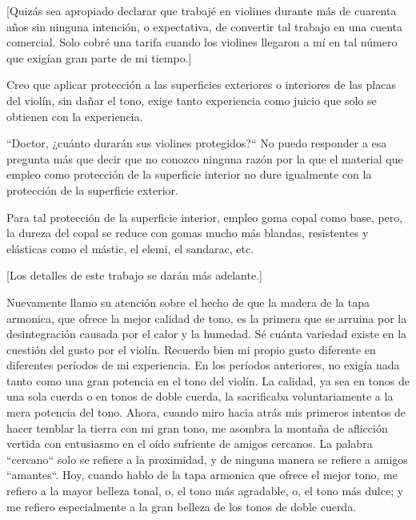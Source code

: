 \documentclass[12pt]{book}
\begin{document}
[Quizás sea apropiado declarar que trabajé en violines durante más de cuarenta años sin ninguna intención, o expectativa, de convertir tal trabajo en una cuenta comercial. Solo cobré una tarifa cuando los violines llegaron a mí en tal número que exigían gran parte de mi tiempo.]

Creo que aplicar protección a las superficies exteriores o interiores de las placas del violín, sin dañar el tono, exige tanto experiencia como juicio que solo se obtienen con la experiencia.

``Doctor, ¿cuánto durarán sus violines protegidos?`` No puedo responder a esa pregunta más que decir que no conozco ninguna razón por la que el material que empleo como protección de la superficie interior no dure igualmente con la protección de la superficie exterior.

Para tal protección de la superficie interior, empleo goma copal como base, pero, la dureza del copal se reduce con gomas mucho más blandas, resistentes y elásticas como el mástic, el elemi, el sandarac, etc.

[Los detalles de este trabajo se darán más adelante.]

Nuevamente llamo su atención sobre el hecho de que la madera de la tapa armonica, que ofrece la mejor calidad de tono, es la primera que se arruina por la desintegración causada por el calor y la humedad. Sé cuánta variedad existe en la cuestión del gusto por el violín. Recuerdo bien mi propio gusto diferente en diferentes períodos de mi experiencia. En los períodos anteriores, no exigía nada tanto como una gran potencia en el tono del violín. La calidad, ya sea en tonos de una sola cuerda o en tonos de doble cuerda, la sacrificaba voluntariamente a la mera potencia del tono. Ahora, cuando miro hacia atrás mis primeros intentos de hacer temblar la tierra con mi gran tono, me asombra la montaña de aflicción vertida con entusiasmo en el oído sufriente de amigos cercanos. La palabra ``cercano`` solo se refiere a la proximidad, y de ninguna manera se refiere a amigos ``amantes``. Hoy, cuando hablo de la tapa armonica que ofrece el mejor tono, me refiero a la mayor belleza tonal, o, el tono más agradable, o, el tono más dulce; y me refiero especialmente a la gran belleza de los tonos de doble cuerda.
\end{document}
